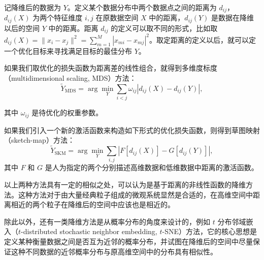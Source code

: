 记降维后的数据为 $Y$。定义某个数据分布中两个数据点之间的距离为 $d_{ij}$，$d_{ij}(X)$ 为两个特征维度 $i,j$ 在原数据空间 $X$ 中的距离，$d_{ij}(Y)$ 是数据在降维以后的空间 $Y$ 中的距离。距离 $d_{ij}$ 的定义可以取不同的形式，比如取 $d_{ij}(X)=\|x_i-x_j\|^2=\sum_{m=1}^{M}|x_{mi}-x_{mj}|^2$。取定距离的定义以后，就可以定一个优化目标来寻找满足目标的最佳分布 $Y$。

如果我们取优化的损失函数为距离差的线性组合，就得到多维度标度（multidimensional scaling, MDS）方法：
\begin{equation}
\widetilde Y_{\mathrm{MDS}}=\arg\min_Y\sum_{i<j}\omega_{ij}|d_{ij}(X)-d_{ij}(Y)|,
\tag{8.2.5}
\end{equation}

其中 $\omega_{ij}$ 是待优化的权重参数。

如果我们引入一个新的激活函数来构造如下形式的优化损失函数，则得到草图映射（sketch-map）方法：
\begin{equation}
\widetilde Y_{\mathrm{SKM}}=\arg\min_Y\sum_{i,j}|F[d_{ij}(X)]-G[d_{ij}(Y)]|,
\tag{8.2.6}
\end{equation}
其中 $F$ 和 $G$ 是人为指定的两个分别描述高维数据和低维数据中距离的激活函数。

以上两种方法具有一定的相似之处，可以认为是基于距离的非线性函数的降维方法。这种方法对于由大量经典粒子组成的微观系统显然是合适的，在高维空间中距离相近的两个粒子在降维后的空间中应该也是相近的。

除此以外，还有一类降维方法是从概率分布的角度来设计的，例如 $t$ 分布邻域嵌入（$t$-distributed stochastic neighbor embedding, $t$-SNE）方法，它的核心思想是定义某种衡量数据之间是否互为近邻的概率分布，并试图在降维后的空间中尽量保证这种不同数据的近邻概率分布与原高维空间中的分布具有相似性。


